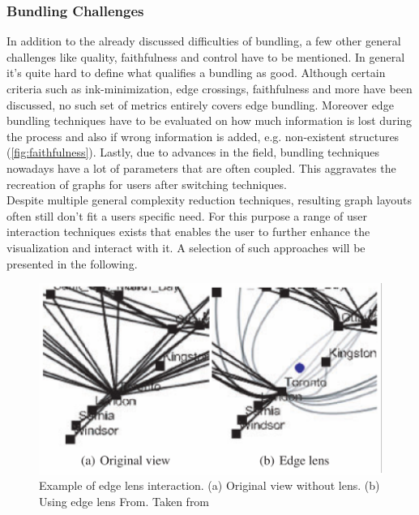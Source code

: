 \subsubsection{Bundling Challenges}
In addition to the already discussed difficulties of bundling, a few other general challenges like quality, faithfulness and control have to be mentioned.
In general it's quite hard to define what qualifies a bundling as good. Although certain criteria such as ink-minimization, edge crossings, faithfulness and more have been discussed, no such set of metrics entirely covers edge bundling\cite{Lhuillier2017}. 
Moreover edge bundling techniques have to be evaluated on how much information is lost during the process and also if wrong information is added, e.g. non-existent structures (\autoref{fig:faithfulness}). Lastly, due to advances in the field, bundling techniques nowadays have a lot of parameters that are often coupled. This aggravates the recreation of graphs for users after switching techniques.\\
Despite multiple general complexity reduction techniques, resulting graph layouts often still don't fit a users specific need. 
For this purpose a range of user interaction techniques exists that enables the user to further enhance the visualization and interact with it. A selection of such approaches will be presented in the following. 

\begin{figure}
    \centering
    \includegraphics{media/edge_lense.pdf}
    \caption{Example of edge lens interaction. (a) Original view without lens. (b) Using edge lens From. Taken from \cite{VonLandesberger2011}}
    \label{fig:edge_lense}
\end{figure}
